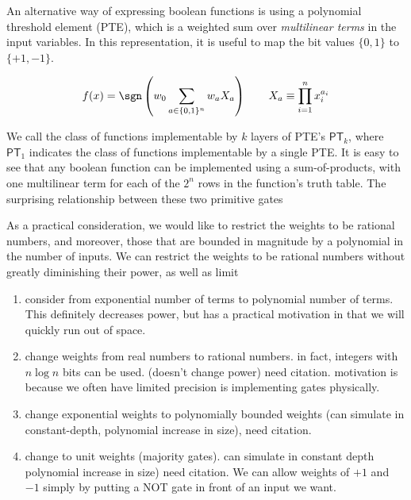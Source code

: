 An alternative way of expressing boolean functions is using a polynomial
threshold element (PTE), which is a weighted sum over \emph{multilinear terms}
in the input variables. In this representation, it is useful to
map the bit values $\{0,1\}$ to $\{+1,-1\}$.

\begin{equation}
f(x) = \sgn\left( w_0 \sum_{a \in \{0,1\}^n} w_a X_a \right) \qquad X_a \equiv \prod_{i=1}^n x_i^{a_i}
\end{equation}

We call the class of functions implementable by $k$ layers of PTE's
$\textsf{PT}_k$, where $\textsf{PT}_1$ indicates the class of functions
implementable by a single PTE.
It is easy to see that any boolean function can be implemented using
a sum-of-products, with one multilinear term for each of the $2^n$
rows in the function's truth table. The surprising relationship between
these two primitive gates 

As a practical consideration, we would like to restrict the weights
to be rational numbers, and moreover, those that are bounded
in magnitude by a polynomial in the number of inputs. 
We can restrict the weights to be rational numbers without
greatly diminishing their power, as well as limit  \cite{}
\begin{enumerate}

\item
consider from exponential number of terms to polynomial number
of terms. This definitely decreases power, but has a practical
motivation in that we will quickly run out of space.

\item
change weights from real numbers to rational numbers. in fact,
integers with $n \log n$ bits can be used. (doesn't change power) need citation. motivation is because we often have limited precision is
implementing gates physically.

\item
change exponential weights to polynomially bounded weights (can simulate in constant-depth, polynomial increase in size), need
citation.

\item
change to unit weights (majority gates). can simulate in
constant depth polynomial increase in size) need citation.
We can allow weights of $+1$ and $-1$ simply by putting a
NOT gate in front of an input we want.

\end{enumerate}

